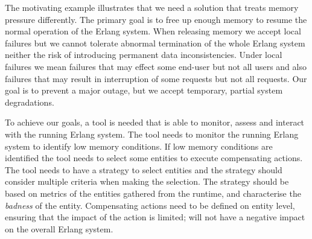 \documentclass{llncs}
\begin{document}
The motivating example illustrates that we need a solution that treats memory pressure differently. The primary goal is to free up enough memory to resume the normal operation of the Erlang system. When releasing memory we accept local failures but we cannot tolerate abnormal termination of the whole Erlang system neither the risk of introducing permanent data inconsistencies. Under local failures we mean failures that may effect some end-user but not all users and also failures that may result in interruption of some requests but not all requests. Our goal is to prevent a major outage, but we accept temporary, partial system degradations.

To achieve our goals, a tool is needed that is able to monitor, assess and interact with the running Erlang system. The tool needs to monitor the running Erlang system to identify low memory conditions. If low memory conditions are identified the tool needs to select some entities to execute compensating actions. The tool needs to have a strategy to select entities and the strategy should consider multiple criteria when making the selection. The strategy should be based on metrics of the entities gathered from the runtime, and characterise the \emph{badness} of the entity. Compensating actions need to be defined on entity level, ensuring that the impact of the action is limited; will not have a negative impact on the overall Erlang system.
%
%
%
%
\end{document}
